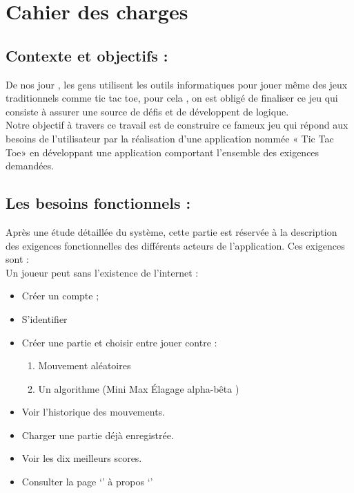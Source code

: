 \section{Cahier des charges}\label{sec:section2}
\subsection{Contexte et objectifs :}

De nos jour , les gens utilisent les outils informatiques pour jouer même des jeux traditionnels comme tic tac toe, pour cela , on est obligé de finaliser ce jeu qui consiste à assurer une source de défis et de développent de logique.\\
Notre objectif à travers ce travail est de construire ce fameux jeu  qui répond aux besoins de l’utilisateur par la réalisation d’une application nommée « Tic Tac Toe» en développant une application comportant l’ensemble des exigences demandées.

\subsection{Les besoins fonctionnels :}
Après une étude détaillée du système, cette partie est réservée à la description des exigences fonctionnelles des différents acteurs de l’application.
Ces exigences sont :\\
Un joueur peut sans l’existence de l’internet :
\begin{itemize}
\item	 Créer un compte ;
\item	 S’identifier
\item	 Créer une partie et choisir entre jouer contre :
\begin{enumerate}
\item	 Mouvement aléatoires
\item	 Un algorithme (Mini Max Élagage alpha-bêta )
\end{enumerate}


\item	 Voir l’historique des mouvements. 
\item	 Charger une partie déjà enregistrée.
\item	 Voir les dix meilleurs scores.
\item  Consulter la page ‘’ à propos ‘’ 
\end{itemize}

